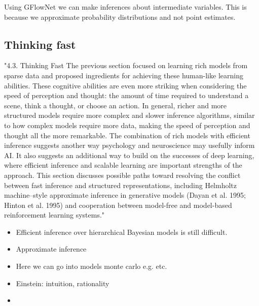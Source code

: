 Using GFlowNet we can make inferences about intermediate variables. This is because we approximate probability distributions and not point estimates.


\subsection{Thinking fast}
\cite{Lake_Ullman_Tenenbaum_Gershman_2017}
"4.3. Thinking Fast The previous section focused on learning rich models from sparse data and proposed ingredients for achieving these human-like learning abilities. These cognitive abilities are even more striking when considering the speed of perception and thought: the amount of time required to understand a scene, think a thought, or choose an action. In general, richer and more structured models require more complex and slower inference algorithms, similar to how complex models require more data, making the speed of perception and thought all the more remarkable. The combination of rich models with efficient inference suggests another way psychology and neuroscience may usefully inform AI. It also suggests an additional way to build on the successes of deep learning, where efficient inference and scalable learning are important strengths of the approach. This section discusses possible paths toward resolving the conflict between fast inference and structured representations, including Helmholtz machine–style approximate inference in generative models (Dayan et al. 1995; Hinton et al. 1995) and cooperation between model-free and model-based reinforcement learning systems."

\begin{itemize}
    \item Efficient inference over hierarchical Bayesian models is still difficult.
    \item Approximate inference
    \item Here we can go into models monte carlo e.g. etc.
    \item Einstein: intuition, rationality
    \item 
\end{itemize}


